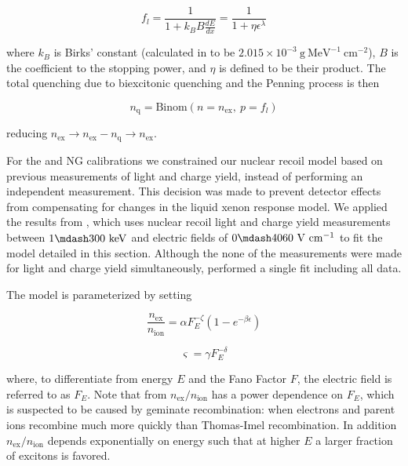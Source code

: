 \begin{equation}
f_l = \frac{1}{1 + k_{B}B \frac{dE}{dx}} = \frac{1}{1 + \eta \epsilon^{\lambda}}
\label{eq:er_nr_calibrations_parameter_determ_nr_birks}
\end{equation}

\noindent where $k_B$ is Birks' constant (calculated in  to be $2.015 \times 10^{-3}\ \mathrm{g\ MeV^{-1}\ cm^{-2}}$),
$B$ is the coefficient to the stopping power, and $\eta$ is defined to be their product.  The total quenching due to biexcitonic quenching
and the Penning process is then

\begin{equation}
n_{\mathrm{q}} = \mathrm{Binom} (n = n_{\mathrm{ex}},\ p = f_l)
\end{equation}

\noindent reducing $n_{\mathrm{ex}} \rightarrow n_{\mathrm{ex}} - n_{\mathrm{q}} \rightarrow n_{\mathrm{ex}}$.

For the \ambe and NG calibrations we constrained our nuclear recoil model based on previous measurements of light and charge yield,
instead of performing an independent measurement.  This decision was made to prevent detector effects from compensating for changes
in the liquid xenon response model.  We applied the results from , which uses nuclear recoil light and charge yield
measurements between $1 \mdash 300\ \mathrm{keV}$ and electric fields of $0 \mdash 4060\ \mathrm{V\ cm^{-1}}$ to fit the model
detailed in this section.  Although the none of the measurements were made for light and charge yield simultaneously, 
performed a single fit including all data.

The model is parameterized by setting

\begin{equation}
\frac{n_{\mathrm{ex}}}{n_{\mathrm{ion}}} = \alpha F_{E}^{-\zeta} ( 1 - e^{-\beta \epsilon})
\label{eq:er_nr_calibrations_parameter_determ_nr_nex_nion}
\end{equation}

\begin{equation}
\varsigma = \gamma F_{E}^{- \delta}
\label{eq:er_nr_calibrations_parameter_determ_nr_recomb_sigma}
\end{equation}

\noindent where, to differentiate from energy $E$ and the Fano Factor $F$, the electric field is referred to as $F_E$.  Note that
from  $n_{\mathrm{ex}} / n_{\mathrm{ion}}$ has a power dependence on $F_E$,
which is suspected to be caused by geminate recombination: when electrons and parent ions recombine much more quickly than Thomas-Imel
recombination.  In addition $n_{\mathrm{ex}} / n_{\mathrm{ion}}$ depends exponentially on energy such that at higher $E$ a larger fraction
of excitons is favored.

